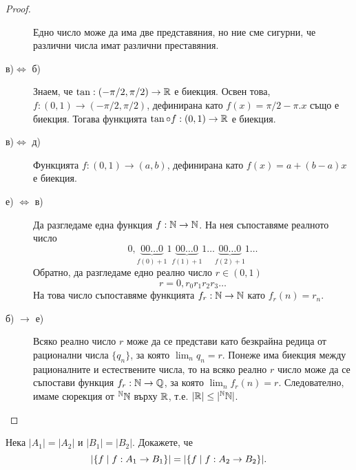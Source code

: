 \begin{proof}
\begin{description}
    Едно число може да има две представяния, но ние сме сигурни, че различни числа имат различни преставяния.
  \item[в)$\iff$ б)]
    Знаем, че $\tan: (-\pi/2,\pi/2) \to \mathbb{R}$ е биекция.
    Освен това, $f: (0,1) \to (-\pi/2,\pi/2)$, дефинирана като
    $f(x) = \pi/2 - \pi.x$ също е биекция.
    Тогава функцията $\tan\circ f : (0,1) \to \mathbb{R}$ е биекция.
  \item[в)$\iff$ д)]
    Функцията $f: (0,1) \to (a,b)$,
    дефинирана като $f(x) = a + (b-a)x$ е биекция.
  \item[е) $\iff$ в)]
    Да разгледаме една функция $f:\mathbb{N}\to\mathbb{N}$.
    На нея съпоставяме реалното число
    \[0,\underbrace{00\dots 0}_{f(0)+1}1\underbrace{00\dots 0}_{f(1)+1}1\dots\underbrace{00\dots 0}_{f(2)+1}1\dots\]
    Обратно, да разгледаме едно реално число $r\in (0,1)$
    \[r = 0, r_0r_1r_2r_3\dots\]
    На това число съпоставяме функцията $f_r:\mathbb{N}\to\mathbb{N}$ като $f_r(n) = r_n$.
  \item[б) $\rightarrow$ е)]
    Всяко реално число $r$ може да се представи като безкрайна редица от рационални числа $\{q_n\}$,
    за която $\lim_n q_n = r$.
    Понеже има биекция между рационалните и естествените числа, то на всяко реално $r$ число може да се съпостави
    функция $f_r:\mathbb{N}\to \mathbb{Q}$, за която $\lim_n f_r(n) = r$.
    Следователно, имаме сюрекция от $^{\mathbb{N}}\mathbb{N}$ върху $\mathbb{R}$, т.е. $\lvert{\mathbb{R}}\rvert \leq \lvert{^{\mathbb{N}}\mathbb{N}}\rvert$.
  \end{description}
\end{proof}

\begin{problem}
  Нека $|A_1| = |A_2|$ и $|B_1| = |B_2|$.
  Докажете, че \[\lvert{\{f\mid f:A_1\to B_1\}}\rvert = \lvert{\{f\mid f:A_2\to B_2\}}\rvert.\]
\end{problem}


